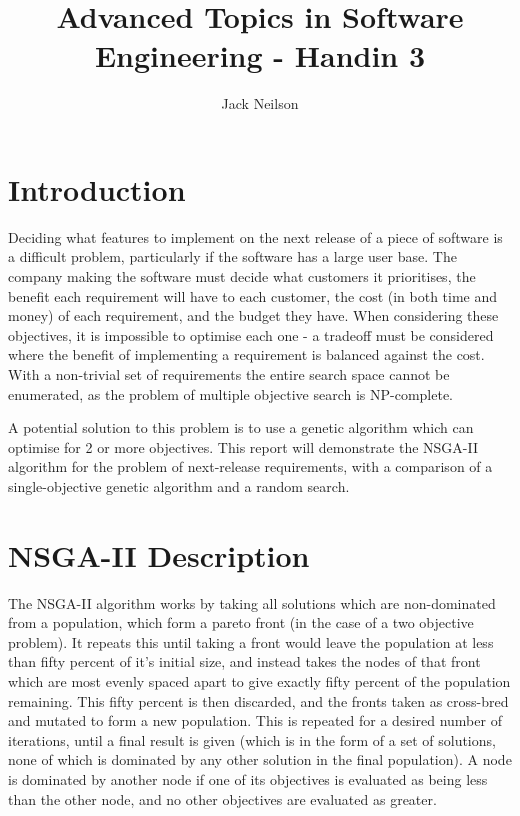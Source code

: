 \documentclass[12pt]{article}
\begin{document}
\title{Advanced Topics in Software Engineering - Handin 3}
\author{Jack Neilson}
\maketitle
\newpage


\section{Introduction}
Deciding what features to implement on the next release of a piece of software is a difficult problem, particularly if the software has a large user base. The company making the software must decide what customers it prioritises, the benefit each requirement will have to each customer, the cost (in both time and money) of each requirement, and the budget they have. When considering these objectives, it is impossible to optimise each one - a tradeoff must be considered where the benefit of implementing a requirement is balanced against the cost. With a non-trivial set of requirements the entire search space cannot be enumerated, as the problem of multiple objective search is NP-complete.

A potential solution to this problem is to use a genetic algorithm which can optimise for 2 or more objectives. This report will demonstrate the NSGA-II algorithm for the problem of next-release requirements, with a comparison of a single-objective genetic algorithm and a random search.


\section{NSGA-II Description}
The NSGA-II algorithm works by taking all solutions which are non-dominated from a population, which form a pareto front (in the case of a two objective problem). It repeats this until taking a front would leave the population at less than fifty percent of it's initial size, and instead takes the nodes of that front which are most evenly spaced apart to give exactly fifty percent of the population remaining. This fifty percent is then discarded, and the fronts taken as cross-bred and mutated to form a new population. This is repeated for a desired number of iterations, until a final result is given (which is in the form of a set of solutions, none of which is dominated by any other solution in the final population). A node is dominated by another node if one of its objectives is evaluated as being less than the other node, and no other objectives are evaluated as greater.
\end{document}

